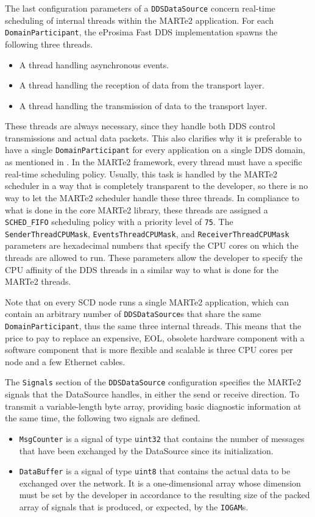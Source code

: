 The last configuration parameters of a \texttt{DDSDataSource} concern real-time scheduling of internal threads within the MARTe2 application. For each \texttt{DomainParticipant}, the eProsima Fast DDS implementation spawns the following three threads.
\begin{itemize}
  \item A thread handling asynchronous events.
  \item A thread handling the reception of data from the transport layer.
  \item A thread handling the transmission of data to the transport layer.
\end{itemize}
These threads are always necessary, since they handle both DDS control transmissions and actual data packets. This also clarifies why it is preferable to have a single \texttt{DomainParticipant} for every application on a single DDS domain, as mentioned in . In the MARTe2 framework, every thread must have a specific real-time scheduling policy. Usually, this task is handled by the MARTe2 scheduler in a way that is completely transparent to the developer, so there is no way to let the MARTe2 scheduler handle these three threads. In compliance to what is done in the core MARTe2 library, these threads are assigned a \texttt{SCHED\_FIFO} scheduling policy with a priority level of \texttt{75}. The \texttt{SenderThreadCPUMask}, \texttt{EventsThreadCPUMask}, and \texttt{ReceiverThreadCPUMask} parameters are hexadecimal numbers that specify the CPU cores on which the threads are allowed to run. These parameters allow the developer to specify the CPU affinity of the DDS threads in a similar way to what is done for the MARTe2 threads.

Note that on every SCD node runs a single MARTe2 application, which can contain an arbitrary number of \texttt{DDSDataSource}s that share the same \texttt{DomainParticipant}, thus the same three internal threads. This means that the price to pay to replace an expensive, EOL, obsolete hardware component with a software component that is more flexible and scalable is three CPU cores per node and a few Ethernet cables.

The \texttt{Signals} section of the \texttt{DDSDataSource} configuration specifies the MARTe2 signals that the DataSource handles, in either the send or receive direction. To transmit a variable-length byte array, providing basic diagnostic information at the same time, the following two signals are defined.
\begin{itemize}
  \item \texttt{MsgCounter} is a signal of type \texttt{uint32} that contains the number of messages that have been exchanged by the DataSource since its initialization.
  \item \texttt{DataBuffer} is a signal of type \texttt{uint8} that contains the actual data to be exchanged over the network. It is a one-dimensional array whose dimension must be set by the developer in accordance to the resulting size of the packed array of signals that is produced, or expected, by the \texttt{IOGAM}s.
\end{itemize}

